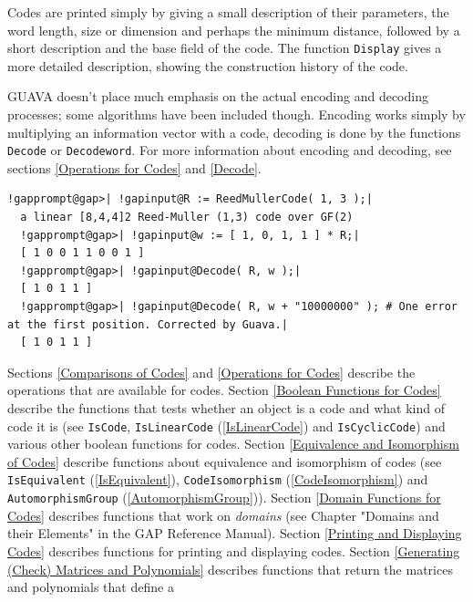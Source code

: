 \documentclass[a4paper,11pt]{report}
\begin{document}
{ Codes are printed simply by giving a small description of their parameters,
the word length, size or dimension and perhaps the minimum distance, followed
by a short description and the base field of the code. The function \texttt{Display} gives a more detailed description, showing the construction history of the
code. 

 \textsf{GUAVA} doesn't place much emphasis on the actual encoding and decoding processes;
some algorithms have been included though. Encoding works simply by
multiplying an information vector with a code, decoding is done by the
functions \texttt{Decode} or \texttt{Decodeword}. For more information about encoding and decoding, see sections \ref{Operations for Codes} and \ref{Decode}. 
\begin{Verbatim}[commandchars=!@|,fontsize=\small,frame=single,label=Example]
  !gapprompt@gap>| !gapinput@R := ReedMullerCode( 1, 3 );|
  a linear [8,4,4]2 Reed-Muller (1,3) code over GF(2)
  !gapprompt@gap>| !gapinput@w := [ 1, 0, 1, 1 ] * R;|
  [ 1 0 0 1 1 0 0 1 ]
  !gapprompt@gap>| !gapinput@Decode( R, w );|
  [ 1 0 1 1 ]
  !gapprompt@gap>| !gapinput@Decode( R, w + "10000000" ); # One error at the first position. Corrected by Guava.|
  [ 1 0 1 1 ]
\end{Verbatim}
  Sections \ref{Comparisons of Codes} and \ref{Operations for Codes} describe the operations that are available for codes. Section \ref{Boolean Functions for Codes} describe the functions that tests whether an object is a code and what kind of
code it is (see \texttt{IsCode}, \texttt{IsLinearCode} (\ref{IsLinearCode}) and \texttt{IsCyclicCode}) and various other boolean functions for codes. Section \ref{Equivalence and Isomorphism of Codes} describe functions about equivalence and isomorphism of codes (see \texttt{IsEquivalent} (\ref{IsEquivalent}), \texttt{CodeIsomorphism} (\ref{CodeIsomorphism}) and \texttt{AutomorphismGroup} (\ref{AutomorphismGroup})). Section \ref{Domain Functions for Codes} describes functions that work on \emph{domains} (see Chapter "Domains and their Elements" in the GAP Reference Manual).
Section \ref{Printing and Displaying Codes} describes functions for printing and displaying codes. Section \ref{Generating (Check) Matrices and Polynomials} describes functions that return the matrices and polynomials that define a
}
\end{document}
